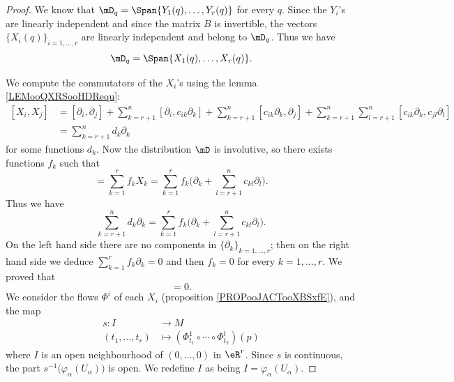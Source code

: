 \begin{proof}
	We know that \( \mD_q=\Span\{ Y_1(q),\ldots, Y_r(q) \}\) for every \( q\). Since the \( Y_i\)'s are linearly independent and since the matrix \( B\) is invertible, the vectors \( \{ X_i(q) \}_{i=1,\ldots, r}\) are linearly independent and belong to \( \mD_q\). Thus we have
	\begin{equation}
		\mD_q=\Span\{ X_1(q),\ldots, X_r(q)  \}.
	\end{equation}

	We compute the commutators of the \( X_i\)'s using the lemma \ref{LEMooQXRSooHDRequ}:
	\begin{subequations}
		\begin{align}
			[X_i,X_j] & =[\partial_i,\partial_j]+\sum_{k=r+1}^n[\partial_i,c_{ik}\partial_k]+\sum_{k=r+1}^n[c_{ik}\partial_k,\partial_j]+\sum_{k=r+1}^n\sum_{l=r+1}^n[c_{ik}\partial_k,c_{jl}\partial_l] \\
			          & =\sum_{k=r+1}^nd_k\partial_k
		\end{align}
	\end{subequations}
	for some functions \( d_k\). Now the distribution \( \mD\) is involutive, so there exists functions \( f_k\) such that
	\begin{equation}
		[X_i,X_j]=\sum_{k=1}^rf_kX_k=\sum_{k=1}^rf_k\big( \partial_k+\sum_{l=r+1}^nc_{kl}\partial_l \big).
	\end{equation}
	Thus we have
	\begin{equation}
		\sum_{k=r+1}^nd_k\partial_k=\sum_{k=1}^rf_k\big( \partial_k+\sum_{l=r+1}^nc_{kl}\partial_l \big).
	\end{equation}
	On the left hand side there are no components in \( \{ \partial_k \}_{k=1,\ldots, r}\); then on the right hand side we deduce \( \sum_{k=1}^rf_k\partial_k=0\) and then \( f_k=0\) for every \( k=1,\ldots, r\). We proved that
	\begin{equation}
		[X_i,X_j]=0.
	\end{equation}
	We consider the flows \( \Phi^i\) of each \( X_i\) (proposition \ref{PROPooJACTooXBSxfE}), and the map
	\begin{equation}
		\begin{aligned}
			s\colon I         & \to M                                                   \\
			(t_1,\ldots, t_r) & \mapsto (\Phi_{t_1}^1\circ \cdots\circ \Phi_{t_2}^t)(p)
		\end{aligned}
	\end{equation}
	where \( I\) is an open neighbourhood of \( (0,\ldots, 0)\) in \( \eR^r\). Since \( s\) is continuous, the part \( s^{-1}\big( \varphi_{\alpha}(U_{\alpha}) \big)\) is open. We redefine \( I\) as being \( I=\varphi_{\alpha}(U_{\alpha})\).


\end{proof}
